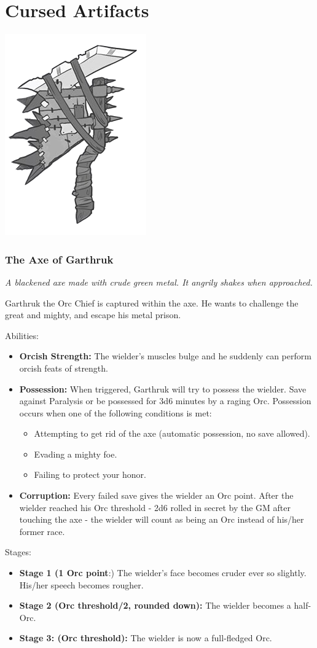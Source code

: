 \documentclass[letterpaper,sansserif,tightsqueeze]{rpg-module}
\begin{document}
\vspace{0.5cm}
\part*{Cursed Artifacts}
\vspace{0.5cm}

\begin{center}
	\includegraphics[width = 0.3\linewidth]{Garthruks_axe.png}
\end{center}
\section{The Axe of Garthruk}
\textit{A blackened axe made with crude green metal. It angrily shakes when approached.}

Garthruk the Orc Chief is captured within the axe. He wants to challenge the great and mighty, and escape his metal prison.

Abilities:
\begin{itemize}
	\item \textbf{Orcish Strength:} The wielder's muscles bulge and he suddenly can perform orcish feats of strength.
	\item \textbf{Possession:} When triggered, Garthruk will try to possess the wielder. Save against Paralysis or be possessed for 3d6 minutes by a raging Orc. Possession occurs when one of the following conditions is met:
	\begin{itemize}
		\item Attempting to get rid of the axe (automatic possession, no save allowed).
		\item Evading a mighty foe.
		\item Failing to protect your honor.
	\end{itemize}
	\item \textbf{Corruption:} Every failed save gives the wielder an Orc point. After the wielder reached his Orc threshold - 2d6 rolled in secret by the GM after touching the axe - the wielder will count as being an Orc instead of his/her former race.
\end{itemize}
Stages: 
\begin{itemize}
	\item \textbf{Stage 1 (1 Orc point}:) The wielder's face becomes cruder ever so slightly. His/her speech becomes rougher. 
	\item \textbf{Stage 2 (Orc threshold/2, rounded down):} The wielder becomes a half-Orc.
	\item \textbf{Stage 3: (Orc threshold):} The wielder is now a full-fledged Orc.
\end{itemize}
\end{document}
